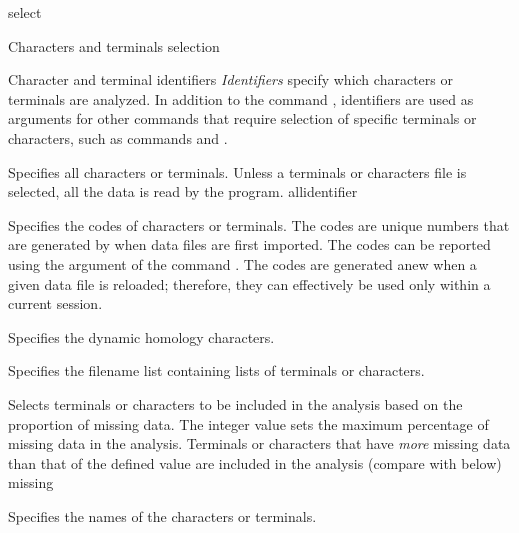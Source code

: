 \begin{command}{select}{}
\begin{arguments}
\begin{argumentgroup}{Characters and terminals selection}
        \end{argumentgroup}
        
        \begin{argumentgroup}{Character and terminal identifiers}\label{identifiers}
            {\emph{Identifiers} specify which characters or terminals are analyzed.
            In addition to the command , identifiers are used as
            arguments for other commands that require selection of specific terminals or
            characters, such as commands  and
            .}

                {Specifies all characters or terminals.  Unless a terminals or characters file
                is selected, all the data is read by the program.}
                {allidentifier}

                {Specifies the codes of characters or terminals. The codes are unique
                numbers that are generated by \poy when data files are first imported.
                The codes can be reported using the argument 
                of the command . The codes are generated anew
                when a given data file is reloaded; therefore, they can effectively be used
                only within a current \poy session.}
                {}

                {Specifies the dynamic homology characters.}
                {}

                {Specifies the filename list containing lists of terminals or
                characters.}
                {}

                {Selects terminals or characters to be included in the analysis
                based on the proportion of missing data. The
                integer value sets the maximum percentage of missing
                data in the analysis. Terminals or characters that have \emph{more} missing data
                than that of the defined value are included in the analysis (compare with  below)}
                {missing}
                
                {Specifies the names of the characters or terminals.}
                {}


\end{argumentgroup}
\end{arguments}
\end{command}
